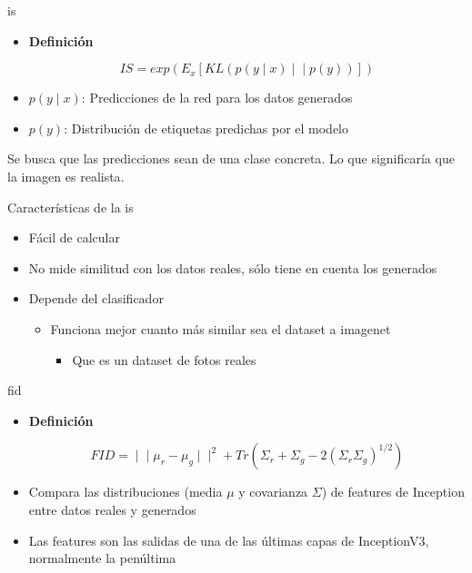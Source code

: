 \begin{frame}{\gls{is} \cite{salimans2016improved}}
\begin{itemize}
    \item \alert{\textbf{Definición}}

    \begin{equation}
        IS=exp(E_x[KL(p(y∣x)∣∣p(y))])
    \end{equation}

    \item \alert{$p(y\mid x)$}: Predicciones de la red para los datos generados
    \item \alert{$p(y)$}: Distribución de etiquetas predichas por el modelo
\end{itemize}
Se busca que las \alert{predicciones} sean de una \alert{clase concreta}. Lo que significaría que la imagen es \alert{realista}.
\end{frame}

\begin{frame}{Características de la \gls{is} \cite{salimans2016improved}}
\begin{itemize}
    \item \alert{Fácil de calcular}
    \item No mide \alert{similitud} con los datos reales, sólo tiene en cuenta los generados
    \item \alert{Depende del clasificador}
    \begin{itemize}
        \item Funciona mejor cuanto más similar sea el dataset a imagenet
        \begin{itemize}
            \item Que es un dataset de fotos reales
        \end{itemize}
    \end{itemize}
\end{itemize}
\end{frame}

\begin{frame}{\gls{fid} \cite{heusel2017gans}}
\begin{itemize}
    \item \alert{\textbf{Definición}}

    \begin{equation}
        FID=∣∣\mu_r −\mu_g ∣∣^2+Tr(\Sigma_r +\Sigma_g −2(\Sigma_r \Sigma_g )^{1/2})
    \end{equation}

    \item Compara las \alert{distribuciones} (media $\mu$ y covarianza $\Sigma$) de features de Inception entre datos reales y generados
    \item Las features son las salidas de una de \alert{las últimas capas} de InceptionV3, normalmente la penúltima
\end{itemize}
\end{frame}

